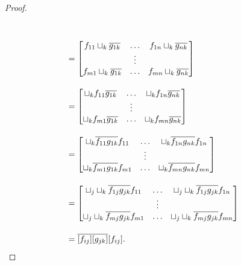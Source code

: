 \begin{proof}
\begin{align*}
        \\[10pt]
      & = \begin{bmatrix}
        f_{11}\sqcup_k \overline{g_{1 k}} &\ldots & f_{1n}\sqcup_k \overline{g_{n k}} \\
        & \vdots & \\
        f_{m1}\sqcup_k \overline{g_{1 k}} &\ldots & f_{m n}\sqcup_k \overline{g_{n k}}
      \end{bmatrix}\\[10pt]
      & = \begin{bmatrix}
        \sqcup_k f_{11}\overline{g_{1 k}} &\ldots & \sqcup_k f_{1n}\overline{g_{n k}} \\
        & \vdots & \\
        \sqcup_k f_{m1}\overline{g_{1 k}} &\ldots & \sqcup_k f_{m n}\overline{g_{n k}}
      \end{bmatrix}\\[10pt]
      & = \begin{bmatrix}
        \sqcup_k \overline{f_{11} g_{1 k}} f_{11} &\ldots & \sqcup_k \overline{f_{1n} g_{n k}} f_{1n}\\
        & \vdots & \\
        \sqcup_k \overline{f_{m1} g_{1 k}}f_{m1} &\ldots & \sqcup_k \overline{f_{m n} g_{n k}}f_{m n}
      \end{bmatrix}\\[10pt]
      & = \begin{bmatrix}
        \sqcup_j\sqcup_k \overline{f_{1j} g_{j k}} f_{11} &\ldots &
          \sqcup_j\sqcup_k \overline{f_{1j} g_{j k}} f_{1n}\\
        & \vdots & \\
        \sqcup_j\sqcup_k \overline{f_{mj} g_{j k}}f_{m1} &\ldots &
          \sqcup_j\sqcup_k \overline{f_{m j} g_{j k}}f_{m n}
      \end{bmatrix}\\[10pt]
      &= \overline{[f_{ij}][g_{j k}]} [f_{ij}].
  \end{align*}
\end{proof}

